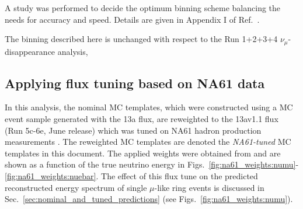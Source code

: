 A study was performed to decide the optimum binning scheme balancing the needs for accuracy and speed.
Details are given in Appendix I of Ref.\ \cite{OurRun123DisappAnalysis3Flavour}.

The binning described here is unchanged with respect to the Run 1+2+3+4 $\nu_{\mu}$-disappearance analysis,


\subsection {Applying flux tuning based on NA61 data}
\label{sec:na61_weights}

In this analysis, the nominal MC templates, which were constructed using a MC event sample generated with the 13a flux,
are reweighted to the 13av1.1 flux (Run 5c-6e, June release) which was tuned on NA61 hadron production measurements \cite{FluxTuning13a}\cite{NA61T2K2014}.
The reweighted MC templates are denoted the {\em NA61-tuned} MC templates in this document.
The applied weights were obtained from \cite{FluxTuning13a} and are shown as a function of the true neutrino energy 
in Figs.~\ref{fig:na61_weights:numu}-\ref{fig:na61_weights:nuebar}.
The effect of this flux tune on the predicted reconstructed energy spectrum of 
single $\mu$-like ring events is discussed in Sec.~\ref{sec:nominal_and_tuned_predictions} 
(see Figs.~\ref{fig:na61_weights:numu}).

